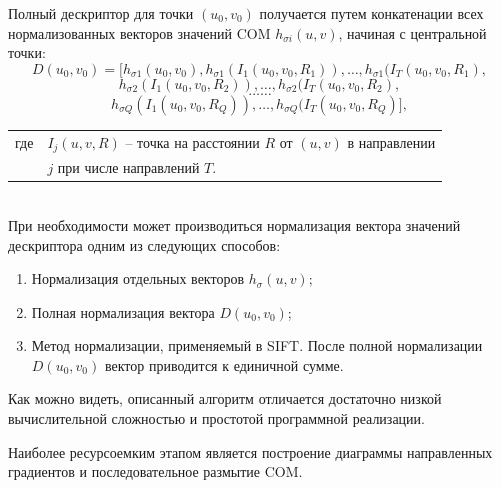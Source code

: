 {{{{{		Полный дескриптор для точки $(u_0,v_0)$ получается путем конкатенации всех нормализованных векторов значений COM $h_{\sigma i}(u,v)$, начиная с центральной точки:
		$$D(u_0,v_0) = [h_{\sigma 1}(u_0, v_0), h_{\sigma 1}(I_1(u_0, v_0, R_1)), \dots, h_{\sigma 1}(I_T(u_0, v_0, R_1),$$ 
		$$h_{\sigma 2}(I_1(u_0, v_0, R_2)), \dots, h_{\sigma 2}(I_T(u_0, v_0, R_2),$$
		$$\dots \dots$$
		$$h_{\sigma Q}(I_1(u_0, v_0, R_Q)), \dots, h_{\sigma Q}(I_T(u_0, v_0, R_Q)],$$
		\begin{tabular}{ rl }
			\quad \quad где 
			& $I_j(u, v, R)$ -- точка на расстоянии $R$ от $(u, v)$ в направлении\\
			& $j$ при числе направлений $T$.
		\end{tabular}\\
		
		При необходимости может производиться нормализация вектора значений дескриптора одним из следующих способов:
			\begin{enumerate}
				\item Нормализация отдельных векторов $h_\sigma(u,v)$;
				\item Полная нормализация вектора $D(u_0,v_0)$;
				\item Метод нормализации, применяемый в SIFT. После полной нормализации $D(u_0,v_0)$ вектор приводится к единичной сумме.
			\end{enumerate}
	
	
		Как можно видеть, описанный алгоритм отличается достаточно низкой вычислительной сложностью и простотой программной реализации. 
		
		Наиболее ресурсоемким этапом является построение диаграммы направленных градиентов и последовательное размытие COM. 
		
}}}}}

